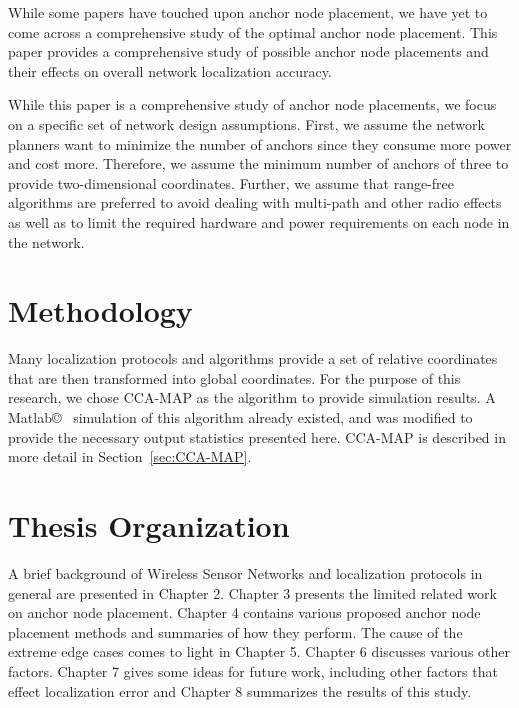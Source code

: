 While some papers have touched upon anchor node placement, we have yet to come across a comprehensive study of the optimal anchor node placement.  This paper provides a comprehensive study of possible anchor node placements and their effects on overall network localization accuracy.

While this paper is a comprehensive study of anchor node placements, we focus on a specific set of network design assumptions.  First, we assume the network planners want to minimize the number of anchors since they consume more power and cost more.  Therefore, we assume the minimum number of anchors of three to provide two-dimensional coordinates. Further, we assume that range-free algorithms are preferred to avoid dealing with multi-path and other radio effects as well as to limit the required hardware and power requirements on each node in the network.  

\section{Methodology}
Many localization protocols and algorithms provide a set of relative coordinates that are then transformed into global coordinates.  For the purpose of this research, we chose CCA-MAP\cite{CCA-MAP07,CCA-MAP09} as the algorithm to provide simulation results.  A Matlab\copyright~  simulation of this algorithm already existed\cite{CCA-MAP07}, and was modified to provide the necessary output statistics presented here.  CCA-MAP is described in more detail in Section~\ref{sec:CCA-MAP}.

\section{Thesis Organization}
A brief background of Wireless Sensor Networks and localization protocols in general are presented in Chapter 2.  Chapter 3 presents the limited related work on anchor node placement.  Chapter 4 contains various proposed anchor node placement methods and summaries of how they perform.  The cause of the extreme edge cases comes to light in Chapter 5.  Chapter 6 discusses various other factors. Chapter 7 gives some ideas for future work, including other factors that effect localization error and Chapter 8 summarizes the results of this study.

